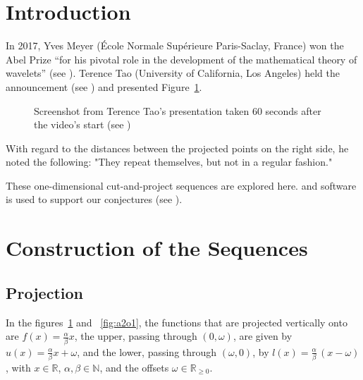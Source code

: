 \documentclass[11pt]{article}
\theoremstyle{remark}
\begin{document}
\section{Introduction}

In 2017, Yves Meyer (École Normale Supérieure Paris-Saclay, France) won the Abel Prize “for his pivotal role in the development of the mathematical theory of wavelets” (see \cite{AbelPriceYvesMeyer}).
%
Terence Tao (University of California, Los Angeles) held the announcement (see \cite{SpeechTao}) and presented Figure~\ref{fig:MeyerSets}.
%
\begin{figure}[htbp]
    \centering
    \caption{Screenshot from Terence Tao's presentation taken 60 seconds after the video's start (see \cite{SpeechTao})}
    \label{fig:MeyerSets}
\end{figure}
%
With regard to the distances between the projected points on the right side, he noted the following: "They repeat themselves, but not in a regular fashion."

These one-dimensional cut-and-project sequences are explored here. \langc and \langp software is used to support our conjectures (see \cite{Kunert2025}).

\section{Construction of the Sequences}

\subsection{Projection}

In the figures~\ref{fig:MeyerSets} and ~\ref{fig:a2o1}, 
the functions that are projected vertically onto are $f(x) = \frac{\alpha}{\beta} x$, 
the upper, passing through $(0, \omega)$, are given by $u(x) = \frac{\alpha}{\beta} x + \omega$, 
and the lower, passing through $(\omega, 0)$, by $l(x) = \frac{\alpha}{\beta} \, (x - \omega)$, 
with $x \in \mathbb{R}$, $\alpha, \beta \in \mathbb{N}$, and the offsets $\omega \in \mathbb{R}_{\ge 0}$.
\end{document}
